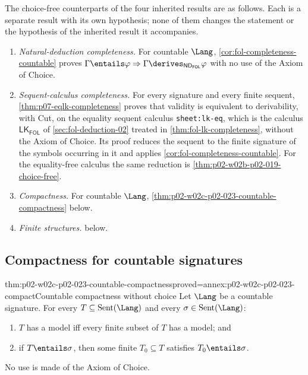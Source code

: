 The choice-free counterparts of the four inherited results are as follows.
Each is a separate result with its own hypothesis; none of them changes the
statement or the hypothesis of the inherited result it accompanies.
\begin{enumerate}
  \item \emph{Natural-deduction completeness.}  For countable \(\Lang\),
        \cref{cor:fol-completeness-countable} proves
        \(\Gamma\entails\varphi\Rightarrow\Gamma\derives_{\mathsf{ND}_{\mathsf{FOL}}}\varphi\)
        with no use of the Axiom of Choice.
  \item \emph{Sequent-calculus completeness.}  For every signature and every
        finite sequent, \cref{thm:p07-eqlk-completeness} proves that validity
        is equivalent to derivability, with Cut, on the equality sequent
        calculus \texttt{sheet:lk-eq}, which is the calculus \(\mathsf{LK}_{\mathsf{FOL}}\)
        of \cref{sec:fol-deduction-02} treated in
        \cref{thm:fol-lk-completeness}, without the Axiom of Choice.  Its
        proof reduces the sequent to the finite signature of the symbols
        occurring in it and applies \cref{cor:fol-completeness-countable}.
        For the equality-free calculus the same reduction is
        \cref{thm:p02-w02b-p02-019-choice-free}.
  \item \emph{Compactness.}  For countable \(\Lang\),
        \cref{thm:p02-w02c-p02-023-countable-compactness} below.
  \item \emph{Finite structures.}
         below.
\end{enumerate}

\subsection{Compactness for countable signatures}
\label{sec:p02-w02c-p02-023-countable}

\begin{hbtheorem}{thm:p02-w02c-p02-023-countable-compactness}{proved=annex:p02-w02c-p02-023-compact}{Countable compactness without choice}
Let \(\Lang\) be a countable signature.  For every
\(T\subseteq\operatorname{Sent}(\Lang)\) and every \(\sigma\in\operatorname{Sent}(\Lang)\):
\begin{enumerate}
  \item \(T\) has a model iff every finite subset of \(T\) has a model; and
  \item if \(T\entails\sigma\), then some finite \(T_0\subseteq T\)
        satisfies \(T_0\entails\sigma\).
\end{enumerate}
No use is made of the Axiom of Choice.
\end{hbtheorem}

